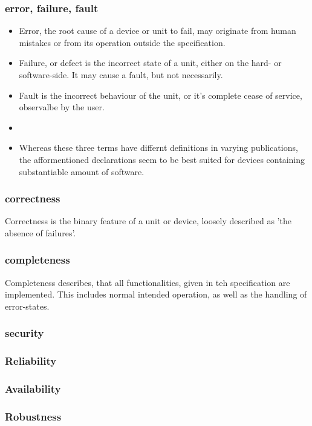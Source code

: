 	\subsubsection{error, failure, fault}
	\begin{itemize}
		\item Error, the root cause of a device or unit to fail, may originate from human mistakes or from its operation outside the specification.
		\item Failure, or defect is the incorrect state of a unit, either on the hard- or software-side. It may cause a fault, but not necessarily.
		\item Fault is the incorrect behaviour of the unit, or it's complete cease of service, observalbe by the user.
		\item {}
		\item Whereas these three terms have differnt definitions in varying publications, the afformentioned declarations seem to be best suited for devices containing substantiable amount of software.
		\end{itemize}
	
	\subsubsection{correctness}
		Correctness is the binary feature of a unit or device, loosely described as 'the absence of failures'. 
	\subsubsection{completeness}
		Completeness describes, that all functionalities, given in teh specification are implemented. This includes normal intended operation, as well as the handling of error-states.
	\subsubsection{security}
	\subsubsection{Reliability}
	\subsubsection{Availability}
	\subsubsection{Robustness}


